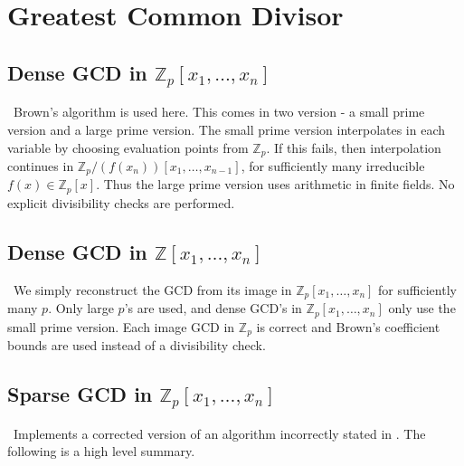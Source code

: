 \documentclass[12pt,reqno]{amsart}
\numberwithin{equation}{section}
\newcommand{\bbZ}[0]  { \mathbb{Z}}
\begin{document}
\section{Greatest Common Divisor}

\subsection{Dense GCD in $\bbZ_p[x_1,\dots,x_n]$}\
Brown's algorithm \cite{Brown} is used here. This comes in two version - a small prime version and a large prime version. The small prime version interpolates in each variable by choosing evaluation points from $\bbZ_p$. If this fails, then interpolation continues in $\bbZ_p/(f(x_n))[x_1,\dots,x_{n-1}]$, for sufficiently many irreducible $f(x) \in \bbZ_p[x]$. Thus the large prime version uses arithmetic in finite fields. No explicit divisibility checks are performed.

\subsection{Dense GCD in $\bbZ[x_1,\dots,x_n]$}\
We simply reconstruct the GCD from its image in $\bbZ_p[x_1,\dots,x_n]$ for sufficiently many $p$. Only large $p$'s are used, and dense GCD's in $\bbZ_p[x_1,\dots,x_n]$ only use the small prime version. Each image GCD in $\bbZ_p$ is correct and Brown's coefficient bounds \cite{Brown} are used instead of a divisibility check.

\subsection{Sparse GCD in $\bbZ_p[x_1,\dots,x_n]$}\
Implements a corrected version of an algorithm incorrectly stated in \cite{SULING}. The following is a high level summary.
\end{document}
